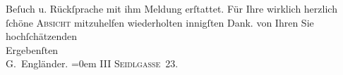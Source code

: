 \begin{ledgroupsized}[t]{13cm}
                    Beſuch u. Rückſprache mit ihm Meldung erſtattet.\pend
           \pstart
           Für Ihre wirklich herzlich ſchöne \textsc{Absicht} mitzuhelfen
                    wiederholten innigſten Dank.\pend
           \pstart
           von Ihren Sie hochſchätzenden{\\[\baselineskip]}Ergebenſten{\\[\baselineskip]}\spacefill\mbox{G. Engländer.}\pend
           \leftskip=0em{}\pstart
           \noindent{}\textsc{III Seidlgasse 23.}\pend
           \endnumbering{}\end{ledgroupsized}  \newcommand{\dateiname}{L02123}\newcommand{\titel}{Georg Engländer an Arthur Schnitzler, 18. 4. 1913}\newcommand{\editorInnen}{Martin Anton Müller und Gerd-Hermann Susen}
            \footnotesize
\begin{ledgroupsized}[t]{11.5cm}
\end{ledgroupsized}
         
      